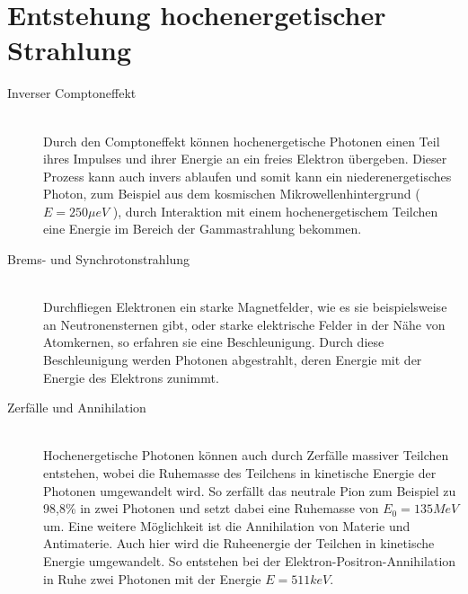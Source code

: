 \section{Entstehung hochenergetischer Strahlung}
\begin{description}
\item[Inverser Comptoneffekt]\hfill \\
Durch den Comptoneffekt können hochenergetische Photonen einen Teil ihres Impulses und ihrer Energie an ein freies Elektron übergeben. Dieser Prozess kann auch invers ablaufen und somit kann ein niederenergetisches Photon, zum Beispiel aus dem kosmischen Mikrowellenhintergrund ($E=250\unit{\mu eV}$ \cite{Grupen}), durch Interaktion mit einem hochenergetischem Teilchen eine Energie im Bereich der Gammastrahlung bekommen.
\item[Brems- und Synchrotonstrahlung]\hfill \\
Durchfliegen Elektronen ein starke Magnetfelder, wie es sie beispielsweise an Neutronensternen gibt, oder starke elektrische Felder in der Nähe von Atomkernen, so erfahren sie eine Beschleunigung. Durch diese Beschleunigung werden Photonen abgestrahlt, deren Energie mit der Energie des Elektrons zunimmt.
\item[Zerfälle und Annihilation]\hfill \\ 
Hochenergetische Photonen können auch durch Zerfälle massiver Teilchen entstehen, wobei die Ruhemasse des Teilchens in kinetische Energie der Photonen umgewandelt wird. So zerfällt das neutrale Pion zum Beispiel zu 98,8\%  in zwei Photonen und setzt dabei eine Ruhemasse von $E_0=135\unit{MeV}$ \cite{PDG} um. Eine weitere Möglichkeit ist die Annihilation von Materie und Antimaterie. Auch hier wird die Ruheenergie der Teilchen in kinetische Energie umgewandelt. So entstehen bei der Elektron-Positron-Annihilation in Ruhe zwei Photonen mit der Energie $E=511\unit{keV}$.
\end{description}

